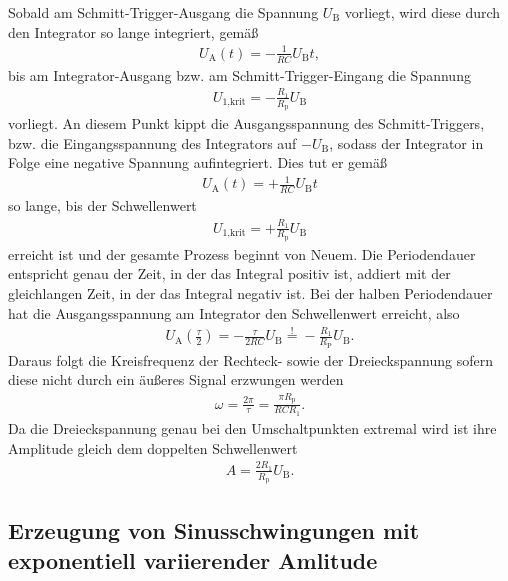 Sobald am Schmitt-Trigger-Ausgang die Spannung $U_\text{B}$ vorliegt, wird diese
durch den Integrator so lange integriert, gemäß
\begin{align}
  U_\text{A}(t) = -\frac1{RC} U_\text{B} t,
\end{align}
bis am Integrator-Ausgang bzw. am Schmitt-Trigger-Eingang die Spannung
\begin{align}
  U_\text{1,krit} = - \frac{R_1}{R_\text{p}} U_\text{B}
\end{align}
vorliegt. An diesem Punkt kippt die Ausgangsspannung des Schmitt-Triggers, bzw. die Eingangsspannung
des Integrators auf $-U_\text{B}$, sodass der Integrator in Folge eine negative Spannung
aufintegriert. Dies tut er gemäß
\begin{align}
  U_\text{A}(t) = + \frac1{RC} U_\text{B} t
\end{align}
so lange, bis der Schwellenwert
\begin{align}
  U_\text{1,krit} = + \frac{R_1}{R_\text{p}} U_\text{B}
\end{align}
erreicht ist und der gesamte Prozess beginnt von Neuem. Die Periodendauer entspricht genau der Zeit, in der das Integral positiv ist, addiert mit
der gleichlangen Zeit, in der das Integral negativ ist. Bei der halben Periodendauer hat die Ausgangsspannung am Integrator den
Schwellenwert erreicht, also
\begin{align}
  U_\text{A}\left( \frac{\tau}{2} \right) = -\frac{\tau}{2RC} U_\text{B} \stackrel{!}{=} -\frac{R_1}{R_\text{P}} U_\text{B}.
\end{align}
Daraus folgt die Kreisfrequenz der Rechteck- sowie der Dreieckspannung sofern diese nicht durch ein
äußeres Signal erzwungen werden
\begin{align}
  \omega = \frac{2\pi}{\tau} = \frac{\pi R_\text{p}}{R C R_1}.
  \label{eqn:freq_signalgen}
\end{align}
Da die Dreieckspannung genau bei den Umschaltpunkten extremal wird ist ihre Amplitude gleich dem
doppelten Schwellenwert
\begin{align}
  A = \frac{2 R_1}{R_\text{p}} U_\text{B}.
  \label{eqn:ampl_drei}
\end{align}

\subsection{Erzeugung von Sinusschwingungen mit exponentiell variierender Amlitude}

